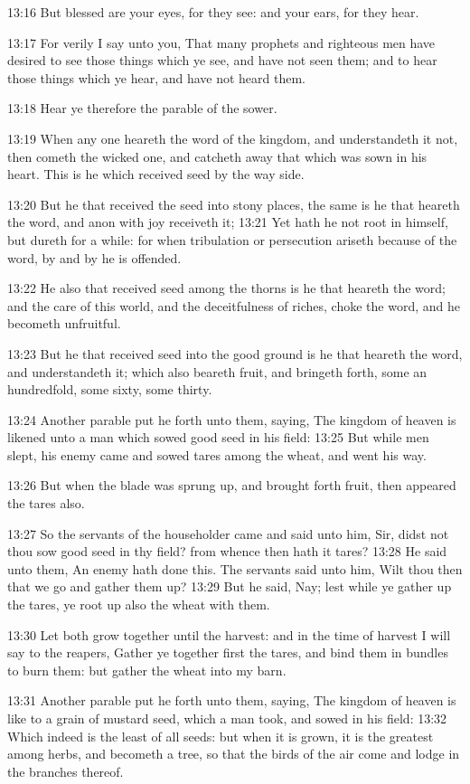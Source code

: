13:16 But blessed are your eyes, for they see: and your ears, for they
hear.

13:17 For verily I say unto you, That many prophets and righteous men
have desired to see those things which ye see, and have not seen them;
and to hear those things which ye hear, and have not heard them.

13:18 Hear ye therefore the parable of the sower.

13:19 When any one heareth the word of the kingdom, and understandeth
it not, then cometh the wicked one, and catcheth away that which was
sown in his heart. This is he which received seed by the way side.

13:20 But he that received the seed into stony places, the same is he
that heareth the word, and anon with joy receiveth it; 13:21 Yet hath
he not root in himself, but dureth for a while: for when tribulation
or persecution ariseth because of the word, by and by he is offended.

13:22 He also that received seed among the thorns is he that heareth
the word; and the care of this world, and the deceitfulness of riches,
choke the word, and he becometh unfruitful.

13:23 But he that received seed into the good ground is he that
heareth the word, and understandeth it; which also beareth fruit, and
bringeth forth, some an hundredfold, some sixty, some thirty.

13:24 Another parable put he forth unto them, saying, The kingdom of
heaven is likened unto a man which sowed good seed in his field: 13:25
But while men slept, his enemy came and sowed tares among the wheat,
and went his way.

13:26 But when the blade was sprung up, and brought forth fruit, then
appeared the tares also.

13:27 So the servants of the householder came and said unto him, Sir,
didst not thou sow good seed in thy field? from whence then hath it
tares?  13:28 He said unto them, An enemy hath done this. The servants
said unto him, Wilt thou then that we go and gather them up?  13:29
But he said, Nay; lest while ye gather up the tares, ye root up also
the wheat with them.

13:30 Let both grow together until the harvest: and in the time of
harvest I will say to the reapers, Gather ye together first the tares,
and bind them in bundles to burn them: but gather the wheat into my
barn.

13:31 Another parable put he forth unto them, saying, The kingdom of
heaven is like to a grain of mustard seed, which a man took, and sowed
in his field: 13:32 Which indeed is the least of all seeds: but when
it is grown, it is the greatest among herbs, and becometh a tree, so
that the birds of the air come and lodge in the branches thereof.


